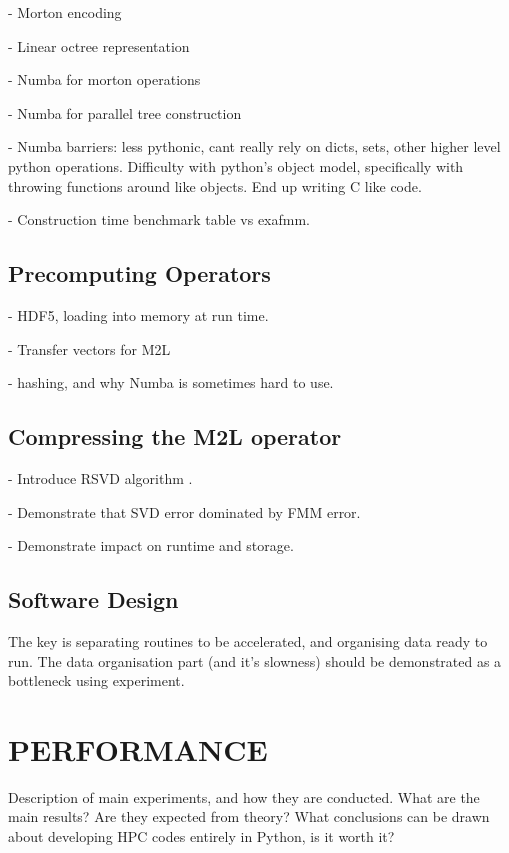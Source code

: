 \documentclass{IEEEcsmag}
\begin{document}
- Morton encoding

- Linear octree representation

- Numba for morton operations

- Numba for parallel tree construction

- Numba barriers: less pythonic, cant really rely on dicts, sets, other higher level python operations. Difficulty with python's object model, specifically with throwing functions around like objects. End up writing C like code.

- Construction time benchmark table vs exafmm.

\subsection{Precomputing Operators}

- HDF5, loading into memory at run time.

- Transfer vectors for M2L

- hashing, and why Numba is sometimes hard to use.

\subsection{Compressing the M2L operator}

- Introduce RSVD algorithm \cite{Halko2011}.

- Demonstrate that SVD error dominated by FMM error.

- Demonstrate impact on runtime and storage.


\subsection{Software Design}

The key is separating routines to be accelerated, and organising data ready to run. The data organisation part (and it's slowness) should be demonstrated as a bottleneck using experiment.

\section{PERFORMANCE}

Description of main experiments, and how they are conducted. What are the main results? Are they expected from theory? What conclusions can be drawn about developing HPC codes entirely in Python, is it worth it?

\end{document}
